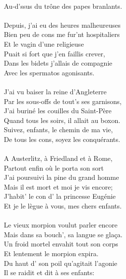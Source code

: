 \\Au-d'ssus du trône des papes branlants.
\\\\Depuis, j'ai eu des heures malheureuses
\\Bien peu de cons me fur'nt hospitaliers
\\Et le vagin d'une religieuse
\\Puait si fort que j'en faillis crever,
\\Dans les bidets j'allais de compagnie
\\Avec les spermatos agonisants.
\\\\J'ai vu baiser la reine d'Angleterre
\\Par les sous-offs de tout's ses garnisons,
\\J'ai buriné les couilles du Saint-Père
\\Quand tous les soirs, il allait au boxon.
\\Suivez, enfants, le chemin de ma vie,
\\De tous les cons, soyez les conquérants.
\\\\A Austerlitz, à Friedland et à Rome,
\\Partout enfin où le porta son sort
\\J'ai poursuivi la pine du grand homme
\\Mais il est mort et moi je vis encore;
\\J'habit' le con d' la princesse Eugénie
\\Et je le lègue à vous, mes chers enfants.
\\\\Le vieux morpion voulut parler encore
\\Mais dans sa bouch', sa langue se glaça.
\\Un froid mortel envahit tout son corps
\\Et lentement le morpion expira.
\\Du haut d' son poil qu'agitait l'agonie
\\Il se raidit et dit à ses enfants:
\breakpage